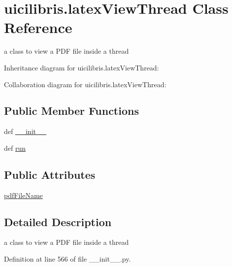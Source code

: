 \hypertarget{classuicilibris_1_1latexViewThread}{\section{uicilibris.\-latex\-View\-Thread \-Class \-Reference}
\label{classuicilibris_1_1latexViewThread}
}


a class to view a \-P\-D\-F file inside a thread  




\-Inheritance diagram for uicilibris.\-latex\-View\-Thread\-:


\-Collaboration diagram for uicilibris.\-latex\-View\-Thread\-:
\subsection*{\-Public \-Member \-Functions}
\begin{DoxyCompactItemize}
\item 
def \hyperlink{classuicilibris_1_1latexViewThread_af503531fb89e56a5727c2241c91763e7}{\-\_\-\-\_\-init\-\_\-\-\_\-}
\item 
def \hyperlink{classuicilibris_1_1latexViewThread_a1ce993aec287c3df73fd061a2b64732b}{run}
\end{DoxyCompactItemize}
\subsection*{\-Public \-Attributes}
\begin{DoxyCompactItemize}
\item 
\hyperlink{classuicilibris_1_1latexViewThread_a2280202512f395afb09e42f820d27fad}{pdf\-File\-Name}
\end{DoxyCompactItemize}


\subsection{\-Detailed \-Description}
a class to view a \-P\-D\-F file inside a thread 

\-Definition at line 566 of file \-\_\-\-\_\-init\-\_\-\-\_\-.\-py.



